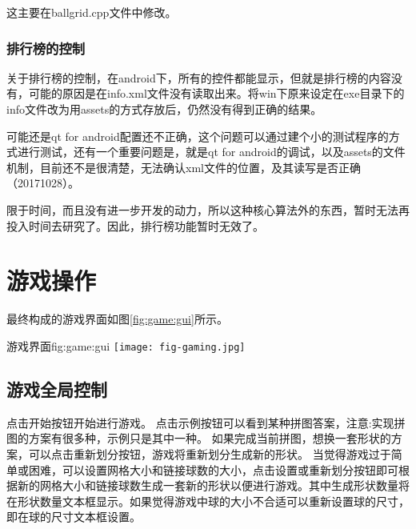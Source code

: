 \documentclass[11pt,twoside]{article} %
\begin{document}
这主要在ballgrid.cpp文件中修改。

\subsubsection{排行榜的控制}

关于排行榜的控制，在android下，所有的控件都能显示，但就是排行榜的内容没有，可能的原因是在info.xml文件没有读取出来。将win下原来设定在exe目录下的info文件改为用assets的方式存放后，仍然没有得到正确的结果。

可能还是qt for android配置还不正确，这个问题可以通过建个小的测试程序的方式进行测试，还有一个重要问题是，就是qt for android的调试，以及assets的文件机制，目前还不是很清楚，无法确认xml文件的位置，及其读写是否正确（20171028）。

限于时间，而且没有进一步开发的动力，所以这种核心算法外的东西，暂时无法再投入时间去研究了。因此，排行榜功能暂时无效了。




\section{游戏操作}
最终构成的游戏界面如图\ref{fig:game:gui}所示。

\begin{insertfigure}{游戏界面}{fig:game:gui}{}%
  \centering
  \texttt{[image: fig-gaming.jpg]}
\end{insertfigure}

\subsection{游戏全局控制}
点击开始按钮开始进行游戏。
点击示例按钮可以看到某种拼图答案，注意:实现拼图的方案有很多种，示例只是其中一种。
如果完成当前拼图，想换一套形状的方案，可以点击重新划分按钮，游戏将重新划分生成新的形状。
当觉得游戏过于简单或困难，可以设置网格大小和链接球数的大小，点击设置或重新划分按钮即可根据新的网格大小和链接球数生成一套新的形状以便进行游戏。其中生成形状数量将在形状数量文本框显示。如果觉得游戏中球的大小不合适可以重新设置球的尺寸，即在球的尺寸文本框设置。
\end{document}

